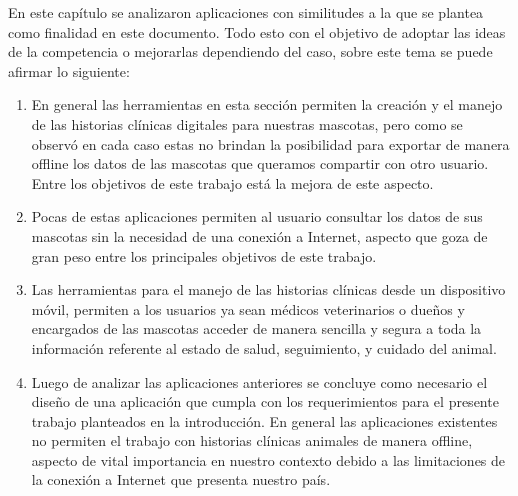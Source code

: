 En este capítulo se analizaron aplicaciones con similitudes a la que se plantea como finalidad en este documento. Todo esto con el objetivo de adoptar las ideas de la competencia o mejorarlas dependiendo del caso, sobre este tema se puede afirmar lo siguiente:
\begin{enumerate}
	\item	En general las herramientas en esta sección permiten la creación y el manejo de las historias clínicas digitales para nuestras mascotas, pero como se observó en cada caso estas no brindan la posibilidad para exportar de manera offline los datos de las mascotas que queramos compartir con otro usuario. Entre los objetivos de este trabajo está la mejora de este aspecto.
	\item	Pocas de estas aplicaciones permiten al usuario consultar los datos de sus mascotas sin la necesidad de una conexión a Internet, aspecto que goza de gran peso entre los principales objetivos de este trabajo.
	\item	Las herramientas para el manejo de las historias clínicas desde un dispositivo móvil, permiten a los usuarios ya sean médicos veterinarios o dueños y encargados de las mascotas acceder de manera sencilla y segura a toda la información referente al estado de salud, seguimiento, y cuidado del animal.
	\item	Luego de analizar las aplicaciones anteriores se concluye como necesario el diseño de una aplicación que cumpla con los requerimientos para el presente trabajo planteados en la introducción. En general las aplicaciones existentes no permiten el trabajo con historias clínicas animales de manera offline, aspecto de vital importancia en nuestro contexto debido a las limitaciones de la conexión a Internet que presenta nuestro país.
\end{enumerate}








